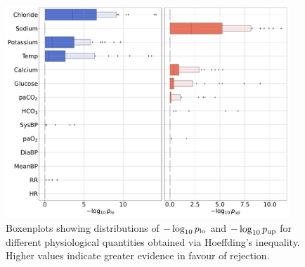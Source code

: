 \begin{figure}[t]%
    \centering
    \includegraphics[height=8cm]{figures/causal/latest_experimental_results/p_vals_hoeff_nogray.pdf}
    \caption{Boxenplots showing distributions of $-\log_{10}{p_\textup{lo}}$ and $-\log_{10}{p_\textup{up}}$ for different physiological quantities obtained via Hoeffding's inequality. Higher values indicate greater evidence in favour of rejection.}
    \label{fig:p_values_hoeff_complete}
\end{figure}
